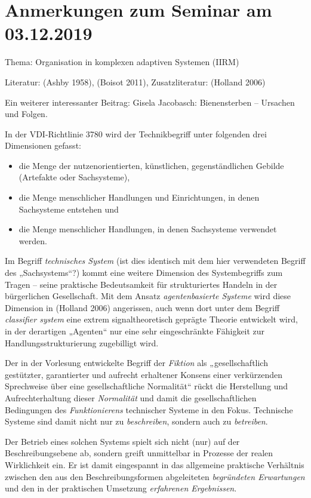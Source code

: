 \documentclass[11pt,a4paper]{article}
\begin{document}
\section{ Anmerkungen zum Seminar am 03.12.2019}

Thema: Organisation in komplexen adaptiven Systemen (IIRM)

Literatur: (Ashby 1958), (Boisot 2011), Zusatzliteratur: (Holland 2006)

Ein weiterer interessanter Beitrag: Gisela Jacobasch: Bienensterben --
Ursachen und Folgen.

In der VDI-Richtlinie 3780 wird der Technikbegriff unter folgenden drei
Dimensionen gefasst: 
\begin{itemize}
\item die Menge der nutzenorientierten, künstlichen, gegenständlichen Gebilde
  (Artefakte oder Sachsysteme),
\item die Menge menschlicher Handlungen und Einrichtungen, in denen
  Sachsysteme entstehen und
\item die Menge menschlicher Handlungen, in denen Sachsysteme verwendet
  werden.
\end{itemize}

Im Begriff \emph{technisches System} (ist dies identisch mit dem hier
verwendeten Begriff des „Sachsystems“?) kommt eine weitere Dimension des
Systembegriffs zum Tragen -- seine praktische Bedeutsamkeit für strukturiertes
Handeln in der bürgerlichen Gesellschaft. Mit dem Ansatz \emph{agentenbasierte
  Systeme} wird diese Dimension in (Holland 2006) angerissen, auch wenn dort
unter dem Begriff \emph{classifier system} eine extrem signaltheoretisch
geprägte Theorie entwickelt wird, in der derartigen „Agenten“ nur eine sehr
eingeschränkte Fähigkeit zur Handlungsstrukturierung zugebilligt wird.

Der in der Vorlesung entwickelte Begriff der \emph{Fiktion} als
„gesellschaftlich gestützter, garantierter und aufrecht erhaltener Konsens
einer verkürzenden Sprechweise über eine gesellschaftliche Normalität“ rückt
die Herstellung und Aufrechterhaltung dieser \emph{Normalität} und damit die
gesellschaftlichen Bedingungen des \emph{Funktionierens} technischer Systeme
in den Fokus. Technische Systeme sind damit nicht nur zu \emph{beschreiben},
sondern auch zu \emph{betreiben}.

Der Betrieb eines solchen Systems spielt sich nicht (nur) auf der
Beschreibungsebene ab, sondern greift unmittelbar in Prozesse der realen
Wirklichkeit ein. Er ist damit eingespannt in das allgemeine praktische
Verhältnis zwischen den aus den Beschreibungsformen abgeleiteten
\emph{begründeten Erwartungen} und den in der praktischen Umsetzung
\emph{erfahrenen Ergebnissen}.
\end{document}
